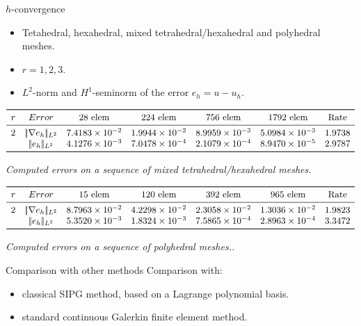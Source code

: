 \documentclass{beamer}
\begin{document}
\begin{frame}{$h$-convergence}
	\begin{itemize}
		\item Tetahedral, hexahedral, mixed tetrahedral/hexahedral and 
		polyhedral meshes.
		\item $r = 1,2,3$.
		\item $L^2$-norm and $H^1$-seminorm of the error $e_h = u - u_h$.
	\end{itemize}
	
	\begin{table} \tiny
		\centering
		\[
		\begin{array}{ccccccc}
		\toprule
		r & Error & \text{28 elem} & \text{224 elem} & \text{756 elem} & 
		\text{1792 elem} & \text{Rate} \\ 
		\midrule
		2 & |\!|\nabla e_{h}|\!|_{L^2} & 7.4183 \times 10^{-2} & 1.9944 \times 
		10^{-2} & 8.9959 \times 10^{-3} & 5.0984 \times 10^{-3} & 1.9738\\
		& |\!|e_{h}|\!|_{L^2} & 4.1276 \times 10^{-3} & 7.0478 \times 10^{-4} & 
		2.1079 \times 10^{-4} & 
		8.9470 \times 10^{-5} & 2.9787\\
		\bottomrule
		\end{array}
		\]
		\caption{\textit{Computed errors on a sequence of mixed 
		tetrahedral/hexahedral meshes.}}
	\[
	\begin{array}{ccccccc}
	\toprule
	r & Error & \text{15 elem} & \text{120 elem} & \text{392 elem} & 
	\text{965 elem} & \text{Rate} \\ 
	\midrule
	2 & |\!|\nabla e_{h}|\!|_{L^2} & 8.7963 \times 10^{-2} & 4.2298 \times 
	10^{-2} & 2.3058 \times 10^{-2} & 1.3036 \times 10^{-2} & 1.9823\\
	& |\!|e_{h}|\!|_{L^2} & 5.3520 \times 10^{-3} & 1.8324 \times 10^{-3} & 
	7.5865 \times 10^{-4} & 2.8963 \times 10^{-4} & 3.3472\\
	\bottomrule
	\end{array}
	\]
	\caption{\textit{Computed errors on a sequence of polyhedral meshes..}} 
\end{table}
	
\end{frame}
\begin{frame}{Comparison with other methods}
	Comparison with:
	\begin{itemize}
		\item classical SIPG method, based on a Lagrange polynomial basis.
		\item standard continuous Galerkin finite element method.
	\end{itemize}
\end{frame}
\end{document}
